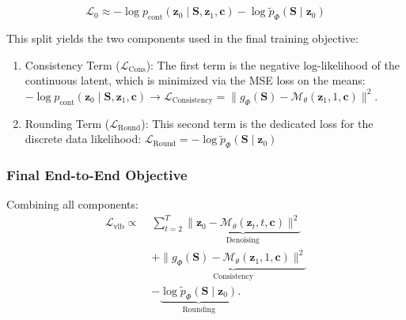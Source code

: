$$\mathcal{L}_0 \approx -\log p_{\mathrm{cont}}(\mathbf{z}_0 \mid \mathbf{S}, \mathbf{z}_1, \mathbf{c}) - \log \tilde{p}_\Phi(\mathbf{S} \mid \mathbf{z}_0)$$

\noindent This split yields the two components used in the final training objective:
\begin{enumerate}
    \item Consistency Term ($\mathcal{L}_{\mathrm{Cons}}$): The first term is the negative log-likelihood of the continuous latent, which is minimized via the MSE loss on the means:
    $-\log p_{\mathrm{cont}}(\mathbf{z}_0 \mid \mathbf{S}, \mathbf{z}_1, \mathbf{c}) \rightarrow \mathcal{L}_{\mathrm{Consistency}} = \bigl\| g_\Phi(\mathbf{S}) - \mathcal{M}_\theta(\mathbf{z}_1,1,\mathbf{c}) \bigr\|^2$.
    \item Rounding Term ($\mathcal{L}_{\text{Round}}$): This second term is the dedicated loss for the discrete data likelihood:
    $\mathcal{L}_{\text{Round}} = -\log \tilde{p}_\Phi(\mathbf{S} \mid \mathbf{z}_0)$
\end{enumerate}

\subsubsection{Final End-to-End Objective}

Combining all components:
\begin{align}
\mathcal{L}_{\mathrm{vlb}}
\propto\;
&\sum_{t=2}^T
\underbrace{
    \bigl\|
        \mathbf{z}_0
        - \mathcal{M}_\theta(\mathbf{z}_t,t,\mathbf{c})
    \bigr\|^2
}_{\text{Denoising}}
\\
&+
\underbrace{
    \bigl\|
        g_\Phi(\mathbf{S})
        - \mathcal{M}_\theta(\mathbf{z}_1,1,\mathbf{c})
    \bigr\|^2
}_{\text{Consistency}}
\\
&-
\underbrace{
    \log \tilde{p}_\Phi(\mathbf{S}\mid\mathbf{z}_0)
}_{\text{Rounding}}.
\end{align}

